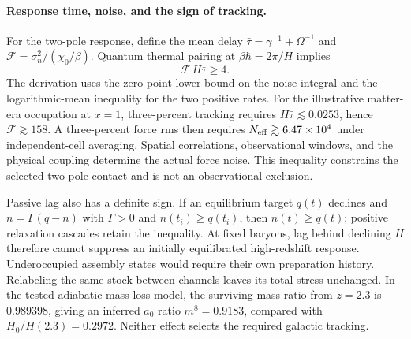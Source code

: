 \paragraph{Response time, noise, and the sign of tracking.}
For the two-pole response, define the mean delay
$\bar\tau=\gamma^{-1}+\Omega^{-1}$ and
$\mathcal F=\sigma_n^2/(\chi_0/\beta)$. Quantum thermal pairing at
$\beta\hbar=2\pi/H$ implies
\[
\mathcal F\,H\bar\tau\ge4.
\]
The derivation uses the zero-point lower bound on the noise integral
and the logarithmic-mean inequality for the two positive rates.
For the illustrative matter-era occupation at $x=1$, three-percent
tracking requires $H\bar\tau\lesssim0.0253$, hence
$\mathcal F\gtrsim158$. A three-percent force rms then requires
$N_{\rm eff}\gtrsim6.47\times10^4$ under independent-cell averaging.
Spatial correlations, observational windows, and the physical coupling
determine the actual force noise. This inequality constrains the selected
two-pole contact and is not an observational exclusion.

Passive lag also has a definite sign. If an equilibrium target $q(t)$
declines and $\dot n=\Gamma(q-n)$ with $\Gamma>0$ and $n(t_i)\ge q(t_i)$,
then $n(t)\ge q(t)$; positive relaxation cascades retain the inequality.
At fixed baryons, lag behind declining $H$ therefore cannot suppress an
initially equilibrated high-redshift response. Underoccupied assembly
states would require their own preparation history. Relabeling the same
stock between channels leaves its total stress unchanged. In the tested
adiabatic mass-loss model, the surviving mass ratio from $z=2.3$ is
$0.989398$, giving an inferred $a_0$ ratio $m^8=0.9183$, compared with
$H_0/H(2.3)=0.2972$. Neither effect selects the required galactic tracking.

